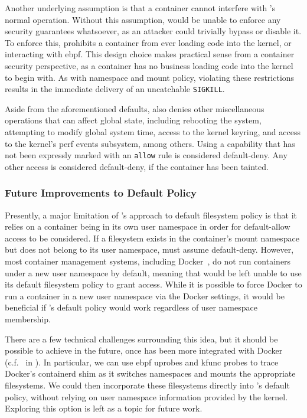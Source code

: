 Another underlying assumption is that a container cannot interfere with \bpfcontain{}'s
normal operation. Without this assumption, \bpfcontain{} would be unable to enforce any
security guarantees whatsoever, as an attacker could trivially bypass or disable it. To
enforce this, \bpfcontain{} prohibits a container from ever loading code into the kernel,
or interacting with \gls{ebpf}. This design choice makes practical sense from a container
security perspective, as a container has no business loading code into the kernel to begin
with. As with namespace and mount policy, violating these restrictions results in the
immediate delivery of an uncatchable \texttt{SIGKILL}.

Aside from the aforementioned defaults, \bpfcontain{} also denies other miscellaneous
operations that can affect global state, including rebooting the system, attempting to
modify global system time, access to the kernel keyring, and access to the kernel's perf
events subsystem, among others. Using a capability that has not been expressly marked with
an \texttt{allow} rule is considered default-deny. Any other access is considered
default-deny, if the container has been tainted.

\subsubsection{Future Improvements to Default Policy}%
\label{sss:bpfcontain-improving-default}

Presently, a major limitation of \bpfcontain{}'s approach to default filesystem policy is
that it relies on a container being in its own user namespace in order for default-allow
access to be considered. If a filesystem exists in the container's mount namespace but
does not belong to its user namespace, \bpfcontain{} must assume default-deny. However,
most container management systems, including Docker~\cite{docker_security}, do not run
containers under a new user namespace by default, meaning that \bpfcontain{} would be left
unable to use its default filesystem policy to grant access. While it is possible to force
Docker to run a container in a new user namespace via the Docker settings, it would be
beneficial if \bpfcontain{}'s default policy would work regardless of user namespace
membership.

There are a few technical challenges surrounding this idea, but it should be possible to
achieve in the future, once \bpfcontain{} has been more integrated with Docker
(c.f.\  in ). In particular, we can use
\gls{ebpf} uprobes and kfunc probes to trace Docker's containerd shim as it switches
namespaces and mounts the appropriate filesystems. We could then incorporate these
filesystems directly into \bpfcontain{}'s default policy, without relying on user
namespace information provided by the kernel. Exploring this option is left as a topic
for future work.

